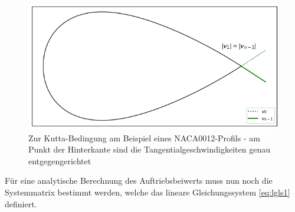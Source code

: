 \begin{figure}
\begin{center} \includegraphics[scale=0.7]{figures/kutta.png} \end{center}
\caption{Zur Kutta-Bedingung am Beispiel eines NACA0012-Profils - am Punkt der Hinterkante sind die Tangentialgeschwindigkeiten genau entgegengerichtet}
\label{fig:kutta}
\end{figure}
Für eine analytische Berechnung des Auftriebsbeiwerts muss nun noch die Systemmatrix bestimmt werden, welche das lineare Gleichungssystem \eqref{eq:lgls1} definiert. \cite{Hess:1966} \cite{Cebeci:1999} \cite{Alonso:2005}

